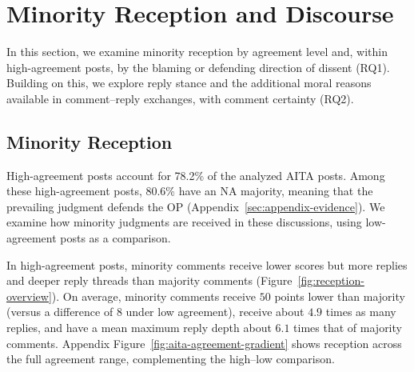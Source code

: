 \section{Minority Reception and Discourse}
\label{sec:results}




In this section, we examine minority reception by agreement level and, within high-agreement posts, by the blaming or defending direction of dissent (RQ1).
Building on this, we explore reply stance and the additional moral
reasons available in comment--reply exchanges, with comment certainty (RQ2). 

\subsection{Minority Reception} 
\label{subsec:res-reception}

High-agreement posts account for 78.2\% of the analyzed AITA posts. 
Among these high-agreement posts, 80.6\% have an NA majority, 
meaning that the prevailing judgment defends the OP (Appendix~\ref{sec:appendix-evidence}). 
We examine how minority
judgments are received in these discussions, using low-agreement posts
as a comparison.

In high-agreement posts, minority comments receive lower scores but more
replies and deeper reply threads than majority comments
(Figure~\ref{fig:reception-overview}). 
On average, minority comments receive $50$ points lower than majority (versus a difference of $8$ under low agreement), receive about $4.9$ times as many replies, and have a mean maximum reply depth about $6.1$ times that of majority comments.
Appendix Figure~\ref{fig:aita-agreement-gradient} shows reception
across the full agreement range, complementing the high--low comparison.

